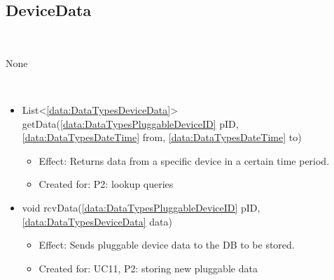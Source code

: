   \subsection{DeviceData}\label{int:PluggableDeviceDatabasePluggableDeviceDataDBDeviceData}
    \begin{description}
      \item[Provided by:] \iconcomponent{}~
      \item[Required by:] None
      \item[Operations:] ~
    \begin{itemize}[noitemsep,nolistsep,leftmargin=-.25cm]
      \item \textsf{List\textless{}\ref{data:DataTypesDeviceData}\textgreater{} getData(\ref{data:DataTypesPluggableDeviceID} pID, \ref{data:DataTypesDateTime} from, \ref{data:DataTypesDateTime} to)}
        \begin{itemize}[noitemsep,nolistsep]
           \item Effect: Returns data from a specific device in a certain time period.
\item Created for: P2: lookup queries
        \end{itemize}
      \item \textsf{void rcvData(\ref{data:DataTypesPluggableDeviceID} pID, \ref{data:DataTypesDeviceData} data)}
        \begin{itemize}[noitemsep,nolistsep]
           \item Effect: Sends pluggable device data to the DB to be stored.
\item Created for: UC11, P2: storing new pluggable data
        \end{itemize}
    \end{itemize}
    \end{description}

